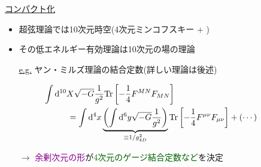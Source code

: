 \documentclass[
  a4paper,uplatex,dvipdfmx,9pt,
  xcolor = {dvipsnames,svgnames},
  hyperref ={colorlinks=true,citecolor=Navy,linkcolor=NavyBlue,urlcolor=purple}
]{beamer}
\begin{document}
\begin{frame}
  \frametitle{\thesection\ \secname}
  
  \uline{コンパクト化}

  \begin{itemize}
    \item 
    超弦理論では10次元時空(4次元ミンコフスキー $+$ )
    \item 
    その低エネルギー有効理論は10次元の場の理論
  \end{itemize}

  \vspace{5pt}

  \begin{itemize}
    \item [\textcolor{black}{\uline{e.g.}}]
    ヤン・ミルズ理論の結合定数(詳しい理論は後述)

    \begin{align}
      &\hspace{-1cm}
      \int\dd^{10}X
      \sqrt{-G}\frac{1}{g^2}\text{Tr}\left[ -\frac{1}{4}F^{MN}F_{MN} \right]
      \nonumber
      \\
      &=
      \int\dd^{4}x
      \underbrace{
        \left(  
          \int\dd^{6}y
          \sqrt{-G}\frac{1}{g^2}
        \right)
      }_{\equiv 1/g_{4D}^2}
      \text{Tr}\left[ -\frac{1}{4}F^{\mu\nu}F_{\mu\nu} \right]
      +
      (\cdots)
      \nonumber
    \end{align}
    
    $\longrightarrow$
    \textcolor{DarkMagenta}{余剰次元の形}が\textcolor{DarkGreen}{4次元のゲージ結合定数など}を決定
    
  \end{itemize}

\end{frame}
\end{document}
